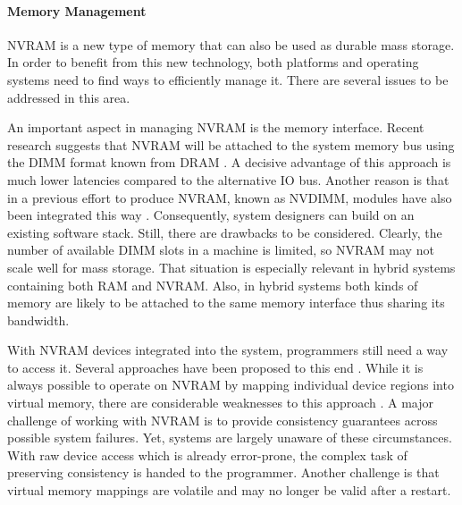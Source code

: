 
\paragraph{Memory Management}

NVRAM is a new type of memory that can also be used as durable mass storage. In
order to benefit from this new technology, both platforms and operating systems
need to find ways to efficiently manage it. There are several issues to be
addressed in this area.


An important aspect in managing NVRAM is the memory interface. Recent research
suggests that NVRAM will be attached to the system memory bus using the DIMM
format known from DRAM \cite{volos2017whisper, oukid2017data, andrei2017sap,
intel2017nvdimm}. A decisive advantage of this approach is much lower latencies
compared to the alternative IO bus. Another reason is that in a previous effort
to produce NVRAM, known as NVDIMM, modules have also been integrated this way
\cite{dulloor2014system, huang2014design}. Consequently, system designers can
build on an existing software stack. Still, there are drawbacks to be
considered. Clearly, the number of available DIMM slots in a machine is limited,
so NVRAM may not scale well for mass storage. That situation is especially
relevant in hybrid systems containing both RAM and NVRAM. Also, in hybrid
systems both kinds of memory are likely to be attached to the same memory
interface thus sharing its bandwidth.

With NVRAM devices integrated into the system, programmers still need a way to
access it. Several approaches have been proposed to this end
\cite{volos2017whisper}. While it is always possible to operate on NVRAM by
mapping individual device regions into virtual memory, there are considerable
weaknesses to this approach \cite{condit2009better, volos2011mnemosyne,
dulloor2014system, volos2017whisper}. A major challenge of working with NVRAM is
to provide consistency guarantees across possible system failures. Yet, systems
are largely unaware of these circumstances. With raw device access which is
already error-prone, the complex task of preserving consistency is handed to the
programmer. Another challenge is that virtual memory mappings are volatile and
may no longer be valid after a restart.

